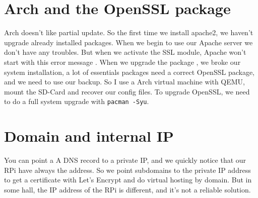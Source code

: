 \documentclass[11pt]{article}
\begin{document}
\section{Arch and the OpenSSL package}

Arch doesn't like partial update. So the first time we install apache2, we haven't upgrade already installed packages. When we begin to use our Apache server we don't have any troubles. But when we activate the SSL module, Apache won't start with this error message .
When we upgrade the package , we broke our system installation, a lot of essentials packages need a correct OpenSSL package, and we need to use our backup. So I use a Arch virtual machine with QEMU, mount the SD-Card and recover our config files. To upgrade OpenSSL, we need to do a full system upgrade with \texttt{pacman -Syu}.

\section{Domain and internal IP}

You can point a A DNS record to a private IP, and we quickly notice that our RPi have always the  address. So we point subdomains to the private IP address to get a certificate with Let's Encrypt and do virtual hosting by domain. But in some hall, the IP address of the RPi is different, and it's not a reliable solution.
\end{document}
